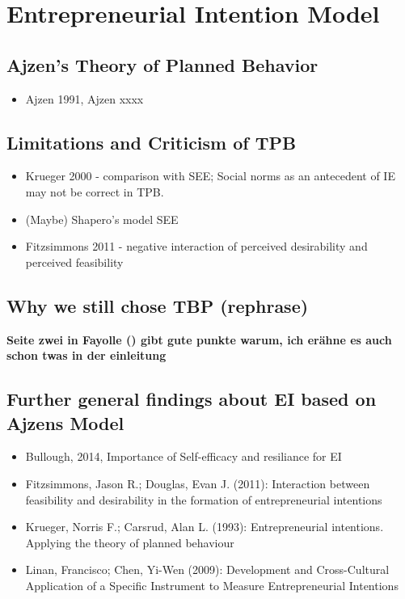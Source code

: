 \section{Entrepreneurial Intention Model}

\subsection{Ajzen's Theory of Planned Behavior}
\begin{itemize}
\item Ajzen 1991, Ajzen xxxx
\end{itemize}

\subsection{Limitations and Criticism of TPB}
\begin{itemize}
\item Krueger 2000 - comparison with SEE; Social norms as an antecedent of IE may not be correct in TPB.
\item (Maybe) Shapero's model SEE
\item Fitzsimmons 2011 - negative interaction of perceived desirability and perceived feasibility
\end{itemize}

\subsection{Why we still chose TBP (rephrase)}
\textbf{Seite zwei in Fayolle (\cite{fayolle2015impact}) gibt gute punkte warum, ich erähne es auch schon twas in der einleitung}

\subsection{Further general findings about EI based on Ajzens Model}
\begin{itemize}
\item Bullough, 2014, Importance of Self-efficacy and resiliance for EI
\item Fitzsimmons, Jason R.; Douglas, Evan J. (2011): Interaction between feasibility and desirability in the formation of entrepreneurial intentions
\item Krueger, Norris F.; Carsrud, Alan L. (1993): Entrepreneurial intentions. Applying the theory of planned behaviour
\item Linan, Francisco; Chen, Yi-Wen (2009): Development and Cross-Cultural Application of a Specific Instrument to Measure Entrepreneurial Intentions
\end{itemize}